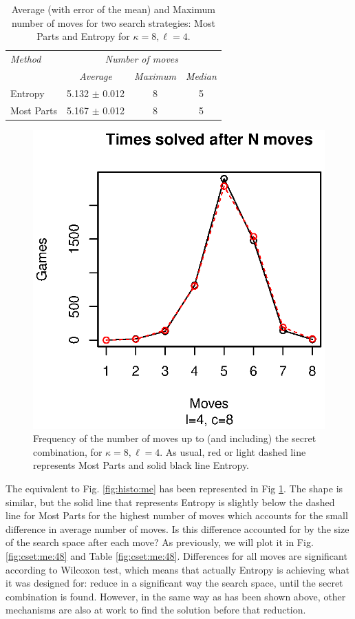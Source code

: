 \documentclass[preprint,12pt]{elsarticle}
\begin{document}
\begin{table}[htb]
\caption{Average (with error of the mean) and Maximum number of moves for two search strategies: Most Parts
  and Entropy for $\kappa=8, \ell=4$. \label{tab:me:48}}
  \centering
\smallskip
\begin{tabular}{|l|c|c|c|}
\hline
\emph{Method} & \multicolumn{3}{c|}{\emph{Number of moves}}\\
 & \emph{Average} & \emph{Maximum} & \emph{Median} \\
\hline
Entropy & 5.132 $\pm$ 0.012 & 8  & 5\\
Most Parts & 5.167 $\pm$ 0.012 & 8 & 5 \\
\hline
\end{tabular}
\end{table}
%
\begin{figure}[!htb]
\centering
\includegraphics{histo-me-4-8.eps}
\caption{Frequency of the number of moves up to (and including) the
  secret combination, for $\kappa=8, \ell=4$. As usual, red or light dashed line 
  represents Most Parts and solid black line Entropy. \label{fig:histo:me:48}}
\end{figure} 

The equivalent to Fig. \ref{fig:histo:me} has been represented in Fig \ref{fig:histo:me:48}.
The shape is similar, but the solid line that represents Entropy is slightly below the
dashed line for Most Parts for the highest number of moves which accounts for the small difference in
average number of moves. Is this difference accounted for by the size
of the search space after each move? As previously, we will plot it in
Fig. \ref{fig:cset:me:48} and Table \ref{fig:cset:me:48}. 
Differences for all moves are significant according to Wilcoxon test,
which means that actually Entropy is achieving what it was designed
for: reduce in a significant way the search space, until the secret
combination is found. However, in the same way as has been shown
above, other mechanisms are also at work to find the solution before
that reduction. 
\end{document}
